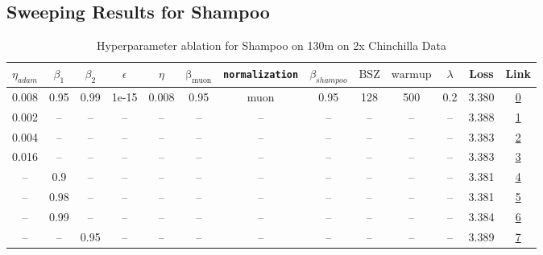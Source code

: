 \subsection{Sweeping Results for Shampoo}%
\begin{table}[H]
\centering
\caption{Hyperparameter ablation for Shampoo on 130m on 2x Chinchilla Data}
\label{tab:ablation_shampoo_130m_2}
\begin{tabular}{ccccccccccccc}
\toprule
$\eta_{adam}$ & $\beta_1$ & $\beta_2$ & $\epsilon$ & $\eta$ & $\mathrm{\beta_{muon}}$ & \texttt{normalization} & $\beta_{shampoo}$ & $\mathrm{BSZ}$ & $\mathrm{warmup}$ & $\lambda$ & Loss & Link \\
\midrule
0.008 & 0.95 & 0.99 & 1e-15 & 0.008 & 0.95 & muon & 0.95 & 128 & 500 & 0.2 & 3.380 & \href{https://wandb.ai/stanford-mercury/optimizer-scaling/runs/sweep-130m-5B-mudamh504ba7lr0.008-alr0.008-wd0.2-minlr0-warmup50-9aff3d}{0} \\
\midrule
0.002 & -- & -- & -- & -- & -- & -- & -- & -- & -- & -- & 3.388 & \href{https://wandb.ai/stanford-mercury/optimizer-scaling/runs/sweep-130m-5B-mudamh9e313dlr0.008-alr0.002-wd0.2-minlr0-warmup50-a940cb}{1} \\
0.004 & -- & -- & -- & -- & -- & -- & -- & -- & -- & -- & 3.383 & \href{https://wandb.ai/stanford-mercury/optimizer-scaling/runs/sweep-130m-5B-mudamha50baalr0.008-alr0.004-wd0.2-minlr0-warmup50-454f7b}{2} \\
0.016 & -- & -- & -- & -- & -- & -- & -- & -- & -- & -- & 3.383 & \href{https://wandb.ai/stanford-mercury/optimizer-scaling/runs/sweep-130m-5B-mudamh233818lr0.008-alr0.016-wd0.2-minlr0-warmup50-1020fc}{3} \\
-- & 0.9 & -- & -- & -- & -- & -- & -- & -- & -- & -- & 3.381 & \href{https://wandb.ai/stanford-mercury/optimizer-scaling/runs/sweep-130m-5B-mudamx707313lr0.008-alr0.008-wd0.2-minlr0-warmup50-4d05d1}{4} \\
-- & 0.98 & -- & -- & -- & -- & -- & -- & -- & -- & -- & 3.381 & \href{https://wandb.ai/stanford-mercury/optimizer-scaling/runs/sweep-130m-5B-mudamhaaae72lr0.008-alr0.008-wd0.2-minlr0-warmup50-cf40f3}{5} \\
-- & 0.99 & -- & -- & -- & -- & -- & -- & -- & -- & -- & 3.384 & \href{https://wandb.ai/stanford-mercury/optimizer-scaling/runs/sweep-130m-5B-mudamhfbe209lr0.008-alr0.008-wd0.2-minlr0-warmup50-8d9cf2}{6} \\
-- & -- & 0.95 & -- & -- & -- & -- & -- & -- & -- & -- & 3.389 & \href{https://wandb.ai/stanford-mercury/optimizer-scaling/runs/sweep-130m-5B-mudamhf740f2lr0.008-alr0.008-wd0.2-minlr0-warmup50-d809d0}{7} \\

\end{tabular}
\end{table}

